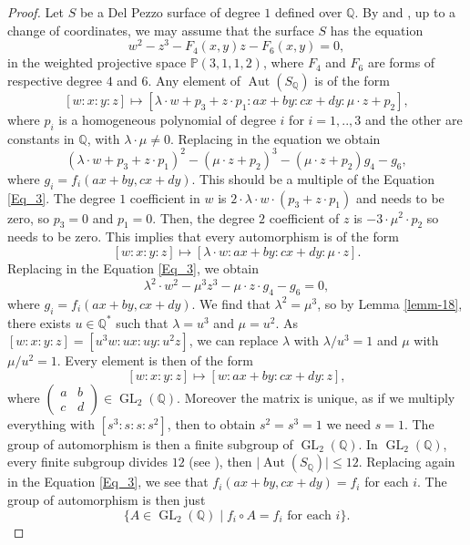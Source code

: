 \documentclass[leqno,12pt]{amsart} %
\newcommand{\Q}{\ensuremath{\mathbb{Q} }}
\newcommand{\p}{\ensuremath{\mathbb{P} }}
\DeclareMathOperator{\Aut}{Aut}
\DeclareMathOperator{\GL}{GL}
\begin{document}
\begin{proof}
    Let $S$ be a Del Pezzo surface of degree $1$ defined over $\Q $. By \cite[Theorem III.3.5]{MR1440180} and \cite[Corollary 3.54]{MR2062787}, up to a change of coordinates, we may assume that the surface $S$ has the equation
    \begin{equation}\label{Eq_3}
        w^2 - z^3 - F_4(x, y)z - F_6(x, y)=0,
    \end{equation}
in the weighted projective space  $\p(3,1,1,2)$, where $F_4$ and $F_6$ are forms of respective degree $4$ and $6$.  Any element of $\Aut(S_{\Q})$ is of the form
\[[w:x:y:z]\mapsto[\lambda\cdot w+p_3+z\cdot p_1:ax+by:cx+dy:\mu\cdot z+p_2],\]
where $p_i$ is a homogeneous polynomial of degree $i$ for $i=1,..,3$ and the other are constants in $\Q$, with $\lambda\cdot\mu\neq0$. Replacing in the equation we obtain
\[(\lambda\cdot w+p_3+z\cdot p_1)^2-(\mu\cdot z+p_2)^3-(\mu\cdot z+p_2)g_4-g_6,\]
where $g_i=f_i(ax+by,cx+dy)$. This should be a multiple of the Equation \ref{Eq_3}. The degree $1$ coefficient in $w$ is $2\cdot \lambda\cdot w\cdot (p_3+z\cdot p_1)$ and needs to be zero, so $p_3=0$ and $p_1=0$. Then, the degree $2$ coefficient of $z$ is $-3\cdot\mu^2\cdot p_2$ so needs to be zero. This implies that every automorphism is of the form 
\[[w:x:y:z]\mapsto[\lambda\cdot w:ax+by:cx+dy:\mu\cdot z].\]
Replacing in the Equation \ref{Eq_3}, we obtain
\[\lambda^2\cdot w^2-\mu^3z^3-\mu\cdot z \cdot g_4-g_6 =0,\]
where $g_i=f_i(ax+by,cx+dy)$. We find that $\lambda^2=\mu^3$, so by Lemma \ref{lemm-18}, there exists $u\in\Q^*$ such that $\lambda=u^3$ and $ \mu=u^2$. As $[w:x:y:z]=[u^3w:ux:uy:u^2z]$, we can replace $\lambda$ with $\lambda/u^3=1$ and $\mu$ with $\mu/u^2=1$. Every element is then of the form
\[[w:x:y:z]\mapsto[w:ax+by:cx+dy:z],\]
where $\left(\begin{array}{cc}
     a& b \\
    c & d
\end{array}\right)\in\GL_2(\Q)$. Moreover the matrix is unique, as if we multiply everything with $[s^3:s:s:s^2]$, then to obtain $s^2=s^3=1$ we need $s=1$. The group of automorphism is then a finite subgroup of $\GL_2(\Q)$. In $\GL_2(\Q)$, every finite subgroup divides $12$ (see \cite[Chap. IX, section 14]{MR340283}), then $\mid \Aut(S_{\Q})\mid \le 12$. Replacing again in the Equation \ref{Eq_3}, we see that $f_i(ax+by,cx+dy)=f_i$ for each $i$. The group of automorphism is then just 
\[\{ A\in \GL_2(\Q) \mid  f_i\circ A=f_i \text{ for each }i\}.\]
\end{proof}
 
\end{document}
